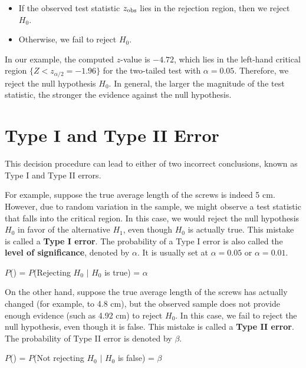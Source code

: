 \documentclass[twoside]{book}
\begin{document}
\begin{itemize}
	\item If the observed test statistic \(z_{\rm obs}\) lies in the rejection region, then we reject \(H_0\).
	\item Otherwise, we fail to reject \(H_0\).
\end{itemize}

In our example, the computed \(z\)-value is \(-4.72\), which lies in the left‐hand critical region \(\{Z < z_{\alpha/2} = -1.96\}\) for the two-tailed test with $\alpha = 0.05$. Therefore, we reject the null hypothesis \(H_0\). In general, the larger the magnitude of the test statistic, the stronger the evidence against the null hypothesis.


\section{Type I and Type II Error}
This decision procedure can lead to either of two incorrect conclusions, known as Type I and Type II errors.

For example, suppose the true average length of the screws is indeed 5 cm. However, due to random variation in the sample, we might observe a test statistic that falls into the critical region. In this case, we would reject the null hypothesis $H_0$ in favor of the alternative $H_1$, even though $H_0$ is actually true. This mistake is called a \textbf{Type I error}. The probability of a Type I error is also called the \textbf{level of significance}, denoted by $\alpha$. It is usually set at $\alpha = 0.05$ or $\alpha = 0.01$.

\begin{textbox}
	\centering $P$()  = $P$(Rejecting $H_0$ $\mid$ $H_0$ is true) = $\alpha$
\end{textbox}

On the other hand, suppose the true average length of the screws has actually changed (for example, to 4.8 cm), but the observed sample does not provide enough evidence (such as 4.92 cm) to reject $H_0$. In this case, we fail to reject the null hypothesis, even though it is false. This mistake is called a \textbf{Type II error}. The probability of Type II error is denoted by $\beta$.

\begin{textbox}
	\centering $P$() = $P$(Not rejecting $H_0$ $\mid$ $H_0$ is false) = $\beta$
\end{textbox}
\end{document}
